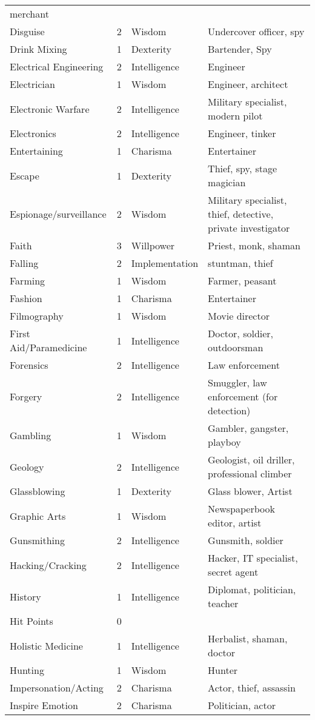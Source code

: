 \documentclass[twoside]{book}
\begin{document}
\begin{longtable}{p{1.25in}llp{12em}}
           merchant\tabularnewline
      \raggedright  Disguise& 2& Wisdom& Undercover officer, spy\tabularnewline
      \raggedright  Drink Mixing& 1& Dexterity& Bartender, Spy\tabularnewline
      \raggedright  Electrical Engineering& 2& Intelligence& Engineer\tabularnewline
      \raggedright  Electrician& 1& Wisdom& Engineer, architect\tabularnewline
      \raggedright  Electronic Warfare& 2& Intelligence& Military specialist,
           modern pilot\tabularnewline
      \raggedright  Electronics& 2& Intelligence& Engineer, tinker\tabularnewline
      \raggedright  Entertaining& 1& Charisma& Entertainer\tabularnewline
      \raggedright  Escape& 1& Dexterity& Thief, spy, stage
           magician\tabularnewline
      \raggedright  Espionage/surveillance& 2& Wisdom& Military specialist,
           thief, detective, private investigator\tabularnewline
      \raggedright  Faith& 3& Willpower& Priest, monk, shaman\tabularnewline
      \raggedright  Falling& 2& Implementation& stuntman, thief\tabularnewline
      \raggedright  Farming& 1& Wisdom& Farmer, peasant\tabularnewline
      \raggedright  Fashion& 1& Charisma& Entertainer\tabularnewline
      \raggedright  Filmography& 1& Wisdom& Movie director\tabularnewline
      \raggedright  First Aid/Paramedicine& 1& Intelligence& Doctor, soldier,
           outdoorsman\tabularnewline
      \raggedright  Forensics& 2& Intelligence& Law enforcement\tabularnewline
      \raggedright  Forgery& 2& Intelligence& Smuggler, law enforcement
           (for detection)\tabularnewline
      \raggedright  Gambling& 1& Wisdom& Gambler, gangster,
           playboy\tabularnewline
      \raggedright  Geology& 2& Intelligence& Geologist, oil driller,
           professional climber\tabularnewline
      \raggedright  Glassblowing& 1& Dexterity& Glass blower, Artist\tabularnewline
      \raggedright  Graphic Arts& 1& Wisdom& Newspaperbook
           editor, artist\tabularnewline
      \raggedright  Gunsmithing& 2& Intelligence& Gunsmith, soldier\tabularnewline
      \raggedright  Hacking/Cracking& 2& Intelligence& Hacker, IT specialist,
           secret agent\tabularnewline
      \raggedright  History& 1& Intelligence& Diplomat, politician,
           teacher\tabularnewline
      \raggedright  Hit Points& 0&\tabularnewline
      \raggedright  Holistic Medicine& 1& Intelligence& Herbalist, shaman, doctor\tabularnewline
      \raggedright  Hunting& 1& Wisdom& Hunter\tabularnewline
      \raggedright  Impersonation/Acting& 2& Charisma& Actor, thief, assassin\tabularnewline
      \raggedright  Inspire Emotion& 2& Charisma& Politician, actor\tabularnewline

\end{longtable}
\end{document}
